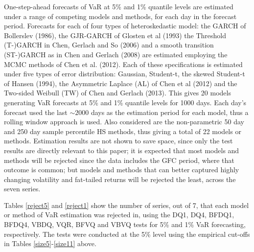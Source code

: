 \documentclass[12pt,epsf]{article}
\begin{document}
One-step-ahead forecasts of VaR at 5\% and 1\% quantile levels are estimated under a range of competing models and methods, for each day in
the forecast period. Forecasts for each of four types of heteroskedastic model: the GARCH of Bollerslev (1986), the GJR-GARCH of
Glosten et al (1993) the Threshold (T-)GARCH in Chen, Gerlach and So (2006) and a smooth transition (ST-)GARCH as in Chen and Gerlach (2008)
are estimated employing the MCMC methods of Chen et al. (2012). Each of these specifications is estimated under five types of error
distribution: Gaussian, Student-t, the skewed Student-t of Hansen (1994), the Asymmetric Laplace (AL) of Chen et al (2012) and the
Two-sided Weibull (TW) of Chen and Gerlach (2013). This gives 20 models generating VaR forecasts at 5\% and 1\% quantile levels for 1000 days.
Each day's forecast used the last $\sim 2000$ days as the estimation period for each model, thus a rolling window approach is used.
Also considered are the non-parametric 50 day and 250 day sample percentile HS methods, thus giving a total of 22 models or methods.
Estimation results are not shown to save space, since only the test results are directly relevant to this paper; it is expected that most models
and methods will be rejected since the data includes the GFC period, where that outcome is common;
but models and methods that can better captured highly changing volatility and fat-tailed returns will be rejected the least,
across the seven series.

Tables \ref{reject5} and \ref{reject1} show the number of series, out of 7, that each model or method of VaR estimation was rejected in,
using the DQ1, DQ4, BFDQ1, BFDQ4, VBDQ, VQR, BFVQ and VBVQ tests for 5\% and 1\% VaR forecasting, respectively.
The tests were conducted at the 5\% level using the empirical cut-offs in Tables \ref{size5}-\ref{size11} above.
\end{document}
